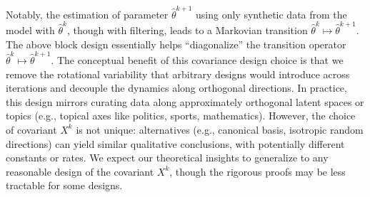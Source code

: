 Notably, the estimation of parameter $\hat{\theta}^{k+1}$ using only synthetic data from the model with $\hat{\theta}^{k}$, though with filtering, leads to a Markovian transition   $\hat{\theta}^k \mapsto \hat{\theta}^{k+1}$. The above block design essentially helps ``diagonalize''  the transition operator $\hat{\theta}^k \mapsto \hat{\theta}^{k+1}$.  
The conceptual benefit of this covariance design choice is that we remove the rotational variability that arbitrary designs would introduce across iterations and decouple the dynamics along orthogonal directions.
In practice,  this design mirrors curating data along approximately orthogonal latent spaces or topics (e.g., topical axes like politics, sports, mathematics).
However, the choice of covariant $X^k$ is not unique:   alternatives (e.g., canonical basis, isotropic random directions) can yield similar qualitative conclusions, with potentially different constants or rates.
We expect our theoretical insights to generalize to any reasonable design of the covariant $X^k$, though the rigorous proofs may be less tractable for some designs.



